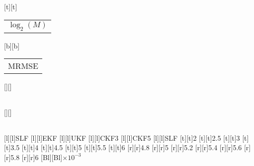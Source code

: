 %
%
[t][t]{\color[rgb]{0,0,0}\setlength{\tabcolsep}{0pt}\begin{tabular}{c}$\log_2 (M)$\end{tabular}}%
[b][b]{\color[rgb]{0,0,0}\setlength{\tabcolsep}{0pt}\begin{tabular}{c}MRMSE\end{tabular}}%
[][]{\color[rgb]{0,0,0}\setlength{\tabcolsep}{0pt}\begin{tabular}{c} \end{tabular}}%
[][]{\color[rgb]{0,0,0}\setlength{\tabcolsep}{0pt}\begin{tabular}{c} \end{tabular}}%
[l][l]{\color[rgb]{0,0,0}SLF}%
[l][l]{\color[rgb]{0,0,0}EKF}%
[l][l]{\color[rgb]{0,0,0}UKF}%
[l][l]{\color[rgb]{0,0,0}CKF3}%
[l][l]{\color[rgb]{0,0,0}CKF5}%
[l][l]{\color[rgb]{0,0,0}SLF}%
%
[t][t]{2}%
[t][t]{2.5}%
[t][t]{3}%
[t][t]{3.5}%
[t][t]{4}%
[t][t]{4.5}%
[t][t]{5}%
[t][t]{5.5}%
[t][t]{6}%
%
[r][r]{4.8}%
[r][r]{5}%
[r][r]{5.2}%
[r][r]{5.4}%
[r][r]{5.6}%
[r][r]{5.8}%
[r][r]{6}%
[Bl][Bl]{$\times 10^{-3}$}%
%
%
